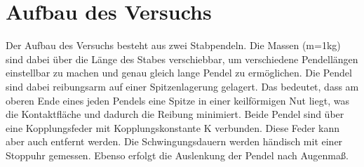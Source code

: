 \documentclass[titlepage=firstcover, captions=tableheading]{scrartcl}
\begin{document}
\section{Aufbau des Versuchs}
\noindent Der Aufbau des Versuchs besteht aus zwei Stabpendeln. Die Massen (m=1kg) sind dabei über die Länge des Stabes verschiebbar, um verschiedene Pendellängen einstellbar zu machen und genau gleich lange Pendel zu ermöglichen. Die Pendel sind dabei reibungsarm auf einer Spitzenlagerung gelagert. Das bedeutet, dass am oberen Ende eines jeden Pendels eine Spitze in einer keilförmigen Nut liegt, was die Kontaktfläche und dadurch die Reibung minimiert. Beide Pendel sind über eine Kopplungsfeder mit Kopplungskonstante K verbunden. Diese Feder kann aber auch entfernt werden. Die Schwingungsdauern werden händisch mit einer Stoppuhr gemessen. Ebenso erfolgt die Auslenkung der Pendel nach Augenmaß. 
\end{document}
